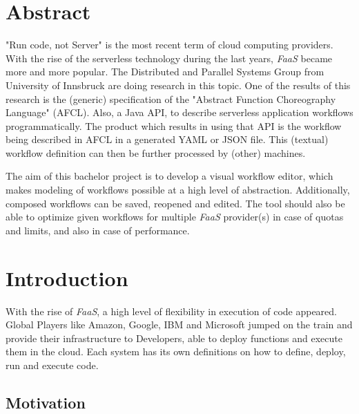 \documentclass[a4paper,11pt,pdftex,halfparskip,cleardoubleempty]{scrbook}
\begin{document}


\cleardoublepage



\cleardoublepage

\pagestyle{plain}

\section*{Abstract}
"Run code, not Server" is the most recent term of cloud computing providers.
With the rise of the serverless technology during the last years, \emph{FaaS} became more and more popular.
The Distributed and Parallel Systems Group from University of Innsbruck are doing research in this topic.
One of the results of this research is the (generic) specification of the "Abstract Function Choreography Language" (AFCL). Also, a Java API, to describe serverless application workflows programmatically.
The product which results in using that API is the workflow being described in AFCL in a generated YAML or JSON file.
This (textual) workflow definition can then be further processed by (other) machines.

The aim of this bachelor project is to develop a visual workflow editor, which makes modeling of workflows possible at a high level of abstraction. Additionally, composed workflows can be saved, reopened and edited. The tool should also be able to optimize  given workflows for multiple \emph{FaaS} provider(s) in case of quotas and limits, and also in case of performance.

\cleardoublepage

\tableofcontents

\newpage

\section{Introduction}

With the rise of \emph{FaaS}, a high level of flexibility in execution of code appeared. Global Players like Amazon, Google, IBM and Microsoft jumped on the train and provide their infrastructure to Developers, able to deploy functions and execute them in the cloud. Each system has its own definitions on how to define, deploy, run and execute code. 

\label{sec:introduction}
\subsection{Motivation}
\end{document}
